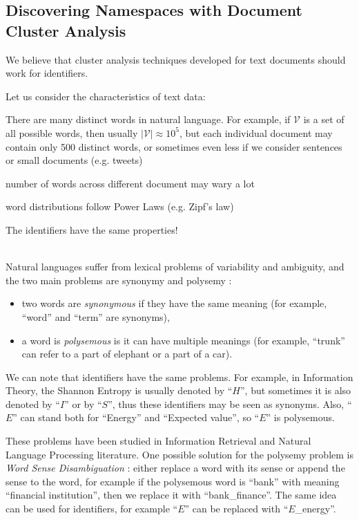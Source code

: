 \subsection{Discovering Namespaces with Document Cluster Analysis} \label{sec:clusters-namespaces}


We believe that cluster analysis techniques developed for
text documents should work for identifiers.

Let us consider the characteristics of text data:

There are many distinct words in natural language. For example,
if $\mathcal V$ is a set of all possible words, then usually $|\mathcal V| \approx 10^5$,
but each individual document may contain only 500 distinct words, or
sometimes even less if we consider sentences or small documents
(e.g. tweets)

number of words across different document may wary a lot

 word distributions follow Power Laws (e.g. Zipf's law)


The identifiers have the same properties!

\ \\


Natural languages suffer from lexical problems of variability and ambiguity,
and the two main problems are synonymy and polysemy \cite{deerwester1990indexing}
\cite{gliozzo2009semantic}:

\begin{itemize}
\itemsep1pt\parskip0pt
  \item two words are \emph{synonymous} if they have the same meaning
        (for example, ``word'' and ``term'' are synonyms),
  \item a word is \emph{polysemous} is it can have multiple meanings
        (for example, ``trunk'' can refer to a part of elephant or a part of a car).
\end{itemize}


We can note that identifiers have the same problems. For example,
in Information Theory, the Shannon Entropy is usually denoted by
``$H$'', but sometimes it is also denoted by ``$I$'' or by ``$S$'',
thus these identifiers may be seen as synonyms.
Also, ``$E$'' can stand both for ``Energy'' and ``Expected value'',
so ``$E$'' is polysemous.

These problems have been studied in Information Retrieval and
Natural Language Processing literature.
One possible solution for the polysemy problem is \emph{Word Sense Disambiguation}
\cite{jurafsky2000speech}: either replace a word with its sense
\cite{stokoe2003word} or append the sense to the word, for example
if the polysemous word is ``bank'' with meaning ``financial institution'',
then we replace it with ``bank\_finance''. The same idea can be used
for identifiers, for example ``$E$'' can be replaced with ``$E$\_energy''.

